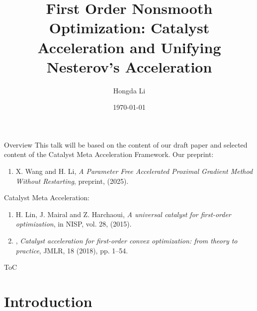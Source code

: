 \documentclass[11pt]{beamer}
\author{Hongda Li}
\title[Thesis Proposal Talk]{First Order Nonsmooth Optimization: Catalyst Acceleration and Unifying Nesterov's Acceleration}
\institute[UBCO]{
    University of British Columbia Okanagan
}
\date{\today}
\theoremstyle{definition}
\begin{document}
\begin{frame}
    \titlepage
\end{frame}
\begin{frame}{Overview}
    This talk will be based on the content of our draft paper and selected content of the Catalyst Meta Acceleration Framework. 
    Our preprint: 
    \begin{enumerate}
        \item X. Wang and H. Li, \textit{A Parameter Free Accelerated Proximal Gradient Method Without Restarting}, preprint, (2025).
    \end{enumerate}
    Catalyst Meta Acceleration:  
    \begin{enumerate}
        \item H. Lin, J. Mairal and Z. Harchaoui, \textit{A universal catalyst for first-order optimization}, in NISP, vol. 28, (2015). 
        \item \underline{\hspace{4em}}, \textit{Catalyst acceleration for first-order convex optimization: from theory to practice}, JMLR, 18 (2018), pp. 1–54.
    \end{enumerate}
\end{frame}

\begin{frame}[allowframebreaks]{ToC}
    \tableofcontents
\end{frame}


\section{Introduction}
\end{document}
